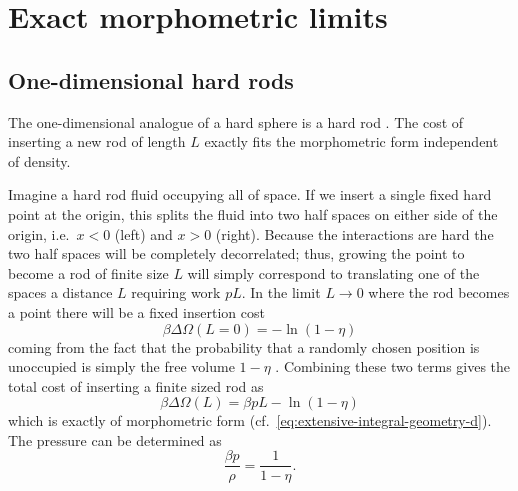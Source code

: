 \documentclass[11pt,twoside]{report}
\begin{document}


\section{Exact morphometric limits}

\subsection{One-dimensional hard rods}
\label{sec:hard-rods}

The one-dimensional analogue of a hard sphere is a hard rod%
.
The cost of inserting a new rod of length $L$ exactly fits the morphometric form independent of density.

Imagine a hard rod fluid occupying all of space.
If we insert a single fixed hard point at the origin, this splits the fluid into two half spaces on either side of the origin, i.e.\ $x < 0$ (left) and $x > 0$ (right).
Because the interactions are hard the two half spaces will be completely decorrelated; thus, growing the point to become a rod of finite size $L$ will simply correspond to translating one of the spaces a distance $L$ requiring work $p L$.
In the limit $L \to 0$ where the rod becomes a point there will be a fixed insertion cost
\begin{equation*}
  \beta \Delta \Omega(L=0) = -\ln{(1-\eta)}
\end{equation*}
coming from the fact that the probability that a randomly chosen position is unoccupied is simply the free volume $1-\eta$ \cite{ReissJCP1959}.
Combining these two terms gives the total cost of inserting a finite sized rod as
\begin{equation}\label{eq:hard-rods-morphometric}
  \beta \Delta \Omega(L) = \beta p L - \ln{(1-\eta)}
\end{equation}
which is exactly of morphometric form (cf.\ \eqref{eq:extensive-integral-geometry-d}).
The pressure can be determined as \cite{TonksPR1936}
\begin{equation}\label{eq:hard-rods-eos}
  \frac{\beta p}{\rho} = \frac{1}{1 - \eta}.
\end{equation}
\end{document}
